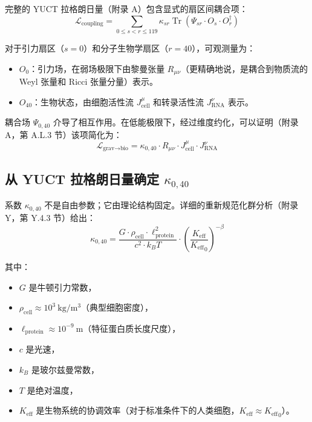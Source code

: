 \documentclass[12pt,a4paper]{article}
\theoremstyle{remark}
\newcommand{\Keff}{K_{\mathrm{eff}}}
\begin{document}
	完整的 YUCT 拉格朗日量（附录 A）包含显式的扇区间耦合项：
	\begin{equation}
		\mathcal{L}_{\text{coupling}} = \sum_{0 \le s < r \le 119} \kappa_{sr} \operatorname{Tr}(\Psi_{sr} \cdot O_s \cdot O_r^\dagger)
		\label{eq:full-coupling}
	\end{equation}
	
	对于引力扇区（\(s=0\)）和分子生物学扇区（\(r=40\)），可观测量为：
	\begin{itemize}
		\item \(O_0\)：引力场，在弱场极限下由黎曼张量 \(R_{\mu\nu}\)（更精确地说，是耦合到物质流的 Weyl 张量和 Ricci 张量分量）表示。
		\item \(O_{40}\)：生物状态，由细胞活性流 \(J_{\text{cell}}^\mu\) 和转录活性流 \(J_{\text{RNA}}^\nu\) 表示。
	\end{itemize}
	
	耦合场 \(\Psi_{0,40}\) 介导了相互作用。在低能极限下，经过维度约化，可以证明（附录 A，第 A.L.3 节）该项简化为：
	\begin{equation}
		\mathcal{L}_{\text{grav}\to\text{bio}} = \kappa_{0,40} \cdot R_{\mu\nu} \cdot J_{\text{cell}}^\mu \cdot J_{\text{RNA}}^\nu
		\label{eq:coupling-raw}
	\end{equation}
	
	\subsection{从 YUCT 拉格朗日量确定 \(\kappa_{0,40}\)}
	
	系数 \(\kappa_{0,40}\) 不是自由参数；它由理论结构固定。详细的重新规范化群分析（附录 Y，第 Y.4.3 节）给出：
	\begin{equation}
		\kappa_{0,40} = \frac{G \cdot \rho_{\text{cell}} \cdot \ell_{\text{protein}}^2}{c^2 \cdot k_B T} \cdot \left( \frac{\Keff}{{\Keff}_0} \right)^{-\beta}
		\label{eq:kappa-exact}
	\end{equation}
	
	其中：
	\begin{itemize}
		\item \(G\) 是牛顿引力常数，
		\item \(\rho_{\text{cell}} \approx 10^3\ \mathrm{kg/m^3}\)（典型细胞密度），
		\item \(\ell_{\text{protein}} \approx 10^{-9}\ \mathrm{m}\)（特征蛋白质长度尺度），
		\item \(c\) 是光速，
		\item \(k_B\) 是玻尔兹曼常数，
		\item \(T\) 是绝对温度，
		\item \(\Keff\) 是生物系统的协调效率（对于标准条件下的人类细胞，\(\Keff \approx {\Keff}_0\)）。
	\end{itemize}
	
\end{document}
